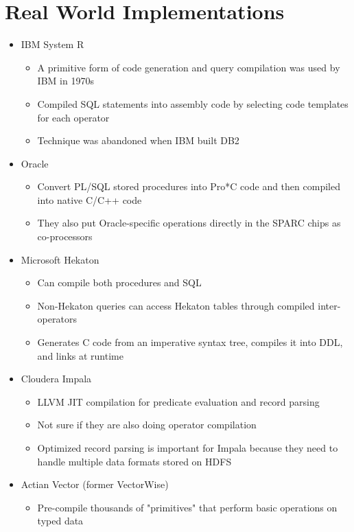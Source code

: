 \documentclass[11pt]{article}
\begin{document}
\section{Real World Implementations}
\begin{itemize}
    \item IBM System R
    \begin{itemize}
        \item A primitive form of code generation and query compilation was used by IBM in 1970s
        \item Compiled SQL statements into assembly code by selecting code templates for each operator
        \item Technique was abandoned when IBM built DB2
    \end{itemize}
    \item Oracle
    \begin{itemize}
        \item Convert PL/SQL stored procedures into Pro*C code and then compiled into native C/C++ code
        \item They also put Oracle-specific operations directly in the SPARC chips as co-processors
    \end{itemize}
    \item Microsoft Hekaton
    \begin{itemize}
        \item Can compile both procedures and SQL
        \item Non-Hekaton queries can access Hekaton tables through compiled inter-operators
        \item Generates C code from an imperative syntax tree, compiles it into DDL, and links at runtime
    \end{itemize}
    \item Cloudera Impala
    \begin{itemize}
        \item LLVM JIT compilation for predicate evaluation and record parsing
        \item Not sure if they are also doing operator compilation
        \item Optimized record parsing is important for Impala because they need to handle multiple data formats stored on HDFS
    \end{itemize}
    \item Actian Vector (former VectorWise)
    \begin{itemize}
        \item Pre-compile thousands of "primitives" that perform basic operations on typed data

\end{itemize}
\end{itemize}
\end{document}
